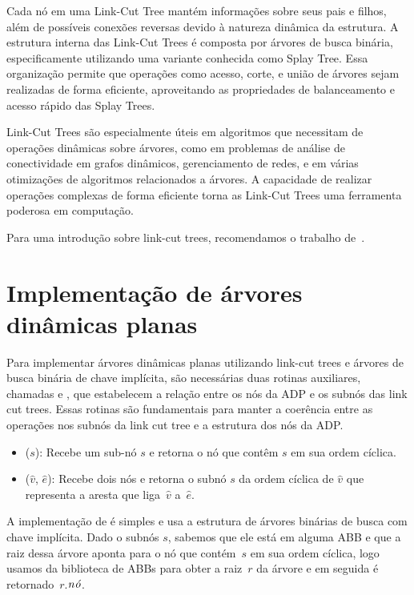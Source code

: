 Cada nó em uma Link-Cut Tree mantém informações sobre seus pais e filhos, além de possíveis conexões reversas devido à natureza dinâmica da estrutura. A estrutura interna das Link-Cut Trees é composta por árvores de busca binária, especificamente utilizando uma variante conhecida como Splay Tree. Essa organização permite que operações como acesso, corte, e união de árvores sejam realizadas de forma eficiente, aproveitando as propriedades de balanceamento e acesso rápido das Splay Trees.

Link-Cut Trees são especialmente úteis em algoritmos que necessitam de operações dinâmicas sobre árvores, como em problemas de análise de conectividade em grafos dinâmicos, gerenciamento de redes, e em várias otimizações de algoritmos relacionados a árvores. A capacidade de realizar operações complexas de forma eficiente torna as Link-Cut Trees uma ferramenta poderosa em computação.

Para uma introdução sobre link-cut trees, recomendamos o trabalho de~\cite{linkcuttree}.



\section{Implementação de árvores dinâmicas planas}
\label{sec:implementacao-ADP}



Para implementar árvores dinâmicas planas utilizando link-cut trees e árvores de busca binária de chave implícita, são necessárias duas rotinas auxiliares, chamadas \LCOFindNode{} e \LCOFindSubNode{}, que estabelecem a relação entre os nós da ADP e os subnós das link cut trees.
Essas rotinas são fundamentais para manter a coerência entre as operações nos subnós da link cut tree e a estrutura dos nós da ADP.

\begin{itemize}
\item \LCOFindNode($s$): Recebe um sub-nó $s$ e retorna o nó que contêm $s$ em sua ordem cíclica.
\item \LCOFindSubNode($\hat v$, $\hat e$): Recebe dois nós e retorna o subnó $s$ da ordem cíclica de $\hat v$ que representa a aresta que liga~$\hat v$ a~$\hat e$.
\end{itemize}


A implementação de \LCOFindNode{} é simples e usa a estrutura de árvores binárias de busca com chave implícita.
Dado o subnós $s$, sabemos que ele está em alguma ABB e que a raiz dessa árvore aponta para o nó que contém~$s$ em sua ordem cíclica, logo usamos \treapGetRoot{} da biblioteca de ABBs para obter a raiz~$r$ da árvore e em seguida é retornado~$r$.$\mathit{n\acute{o}}$.

